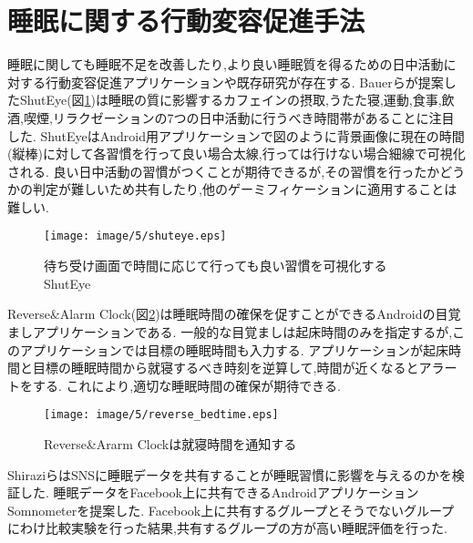 


\section{睡眠に関する行動変容促進手法}
睡眠に関しても睡眠不足を改善したり,より良い睡眠質を得るための日中活動に対する行動変容促進アプリケーションや既存研究が存在する.
Bauerらが提案したShutEye\cite{Shuteye}(図\ref{shuteye})は睡眠の質に影響するカフェインの摂取,うたた寝,運動,食事,飲酒,喫煙,リラクゼーションの7つの日中活動に行うべき時間帯があることに注目した.
ShutEyeはAndroid用アプリケーションで図のように背景画像に現在の時間(縦棒)に対して各習慣を行って良い場合太線,行っては行けない場合細線で可視化される.
良い日中活動の習慣がつくことが期待できるが,その習慣を行ったかどうかの判定が難しいため共有したり,他のゲーミフィケーションに適用することは難しい.

\begin{figure}[tbp]
	\begin{center}
		\texttt{[image: image/5/shuteye.eps]}
		\caption{待ち受け画面で時間に応じて行っても良い習慣を可視化するShutEye}
		\label{shuteye}
	\end{center}
\end{figure}

Reverse\&Alarm Clock\cite{Reverse}(図\ref{reverse})は睡眠時間の確保を促すことができるAndroidの目覚ましアプリケーションである.
一般的な目覚ましは起床時間のみを指定するが,このアプリケーションでは目標の睡眠時間も入力する.
アプリケーションが起床時間と目標の睡眠時間から就寝するべき時刻を逆算して,時間が近くなるとアラートをする.
これにより,適切な睡眠時間の確保が期待できる.

\begin{figure}[tbp]
	\begin{center}
		\texttt{[image: image/5/reverse\_bedtime.eps]}
		\caption{Reverse\&Ararm Clockは就寝時間を通知する}
		\label{reverse}
	\end{center}
\end{figure}

ShiraziらはSNSに睡眠データを共有することが睡眠習慣に影響を与えるのかを検証した.
睡眠データをFacebook上に共有できるAndroidアプリケーションSomnometer\cite{shirazi2013already}を提案した.
Facebook上に共有するグループとそうでないグループにわけ比較実験を行った結果,共有するグループの方が高い睡眠評価を行った.

